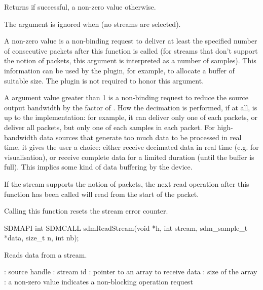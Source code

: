 \documentclass[a4paper,12pt,twoside,extrafontsizes]{memoir}
\begin{document}
\begin{funcret}
	Returns  if successful, a non-zero value otherwise.
\end{funcret}

\begin{funcremarks}
	The  argument is ignored when  (no streams are selected).
	
	A non-zero  value is a non-binding request to deliver at least the specified number of consecutive packets after this function is called (for streams that don't support the notion of packets, this argument is interpreted as a number of samples). This information can be used by the plugin, for example, to allocate a buffer of suitable size. The plugin is not required to honor this argument.
	
	A  argument value greater than 1 is a non-binding request to reduce the source output bandwidth by the factor of . How the decimation is performed, if at all, is up to the implementation: for example, it can deliver only one of each  packets, or deliver all packets, but only one of each  samples in each packet. For high-bandwidth data sources that generate too much data to be processed in real time, it gives the user a choice: either receive decimated data in real time (e.g. for visualisation), or receive complete data for a limited duration (until the buffer is full). This implies some kind of data buffering by the device.
	
	If the stream supports the notion of packets, the next read operation after this function has been called will read from the start of the packet.
	
	Calling this function resets the stream error counter.
\end{funcremarks}



\begin{cfuncprototype}
SDMAPI int SDMCALL sdmReadStream(void *h, int stream, sdm_sample_t *data, size_t n, int nb);
\end{cfuncprototype}

\begin{funcdescr}
	Reads data from a stream.
\end{funcdescr}

\begin{funcparams}
	: source handle
	: stream id
	: pointer to an array to receive data
	: size of the array
	: a non-zero value indicates a non-blocking operation request
\end{funcparams}
\end{document}
